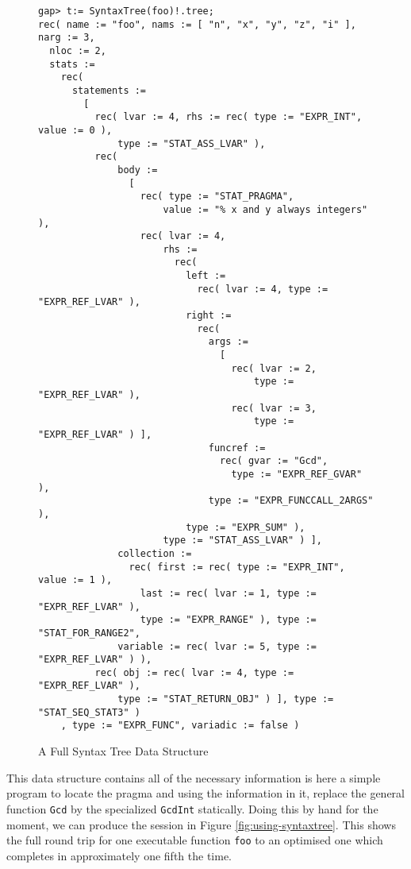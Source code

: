 \begin{figure}[!ht]
  \begin{mdframed}
  \begin{Small}
\begin{verbatim}
gap> t:= SyntaxTree(foo)!.tree;
rec( name := "foo", nams := [ "n", "x", "y", "z", "i" ], narg := 3, 
  nloc := 2, 
  stats := 
    rec( 
      statements := 
        [ 
          rec( lvar := 4, rhs := rec( type := "EXPR_INT", value := 0 ), 
              type := "STAT_ASS_LVAR" ), 
          rec( 
              body := 
                [ 
                  rec( type := "STAT_PRAGMA", 
                      value := "% x and y always integers" ), 
                  rec( lvar := 4, 
                      rhs := 
                        rec( 
                          left := 
                            rec( lvar := 4, type := "EXPR_REF_LVAR" ), 
                          right := 
                            rec( 
                              args := 
                                [ 
                                  rec( lvar := 2, 
                                      type := "EXPR_REF_LVAR" ), 
                                  rec( lvar := 3, 
                                      type := "EXPR_REF_LVAR" ) ], 
                              funcref := 
                                rec( gvar := "Gcd", 
                                  type := "EXPR_REF_GVAR" ), 
                              type := "EXPR_FUNCCALL_2ARGS" ), 
                          type := "EXPR_SUM" ), 
                      type := "STAT_ASS_LVAR" ) ], 
              collection := 
                rec( first := rec( type := "EXPR_INT", value := 1 ), 
                  last := rec( lvar := 1, type := "EXPR_REF_LVAR" ), 
                  type := "EXPR_RANGE" ), type := "STAT_FOR_RANGE2", 
              variable := rec( lvar := 5, type := "EXPR_REF_LVAR" ) ), 
          rec( obj := rec( lvar := 4, type := "EXPR_REF_LVAR" ), 
              type := "STAT_RETURN_OBJ" ) ], type := "STAT_SEQ_STAT3" )
    , type := "EXPR_FUNC", variadic := false )
\end{verbatim}
  \end{Small}
  \end{mdframed}
  \caption{A Full Syntax Tree Data Structure}\label{fig:syntaxtree}
  \end{figure}
  

This data structure contains all of the necessary information is here
a simple \GAP program to locate the pragma and using the information
in it, replace the general function \verb|Gcd| by the specialized
\verb|GcdInt| statically.  Doing this by hand for the moment, we can
produce the session in Figure \ref{fig:using-syntaxtree}. This shows 
the full round trip for one executable \GAP function \verb|foo| to an
optimised one which completes in approximately one fifth the time.

